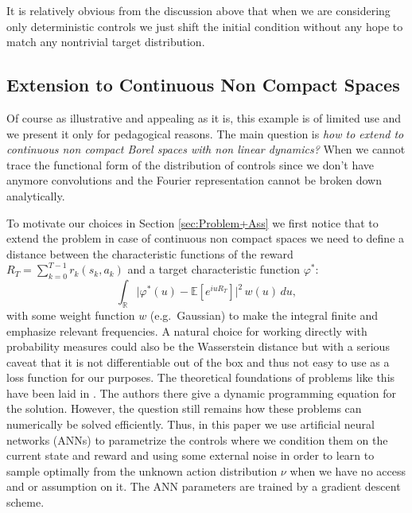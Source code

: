 \documentclass[reqno, 11pt]{amsart}%
\newcommand\EE{\mathbb E}
\theoremstyle{definition}
\newtheorem{remark}[theorem]{Remark}
\begin{document}
	It is relatively obvious from the discussion above that when we are considering only deterministic controls we just shift the initial condition without any hope to match any nontrivial target distribution.  

\subsection{Extension to Continuous Non Compact Spaces} 
Of course as illustrative and appealing as it is, this example is of limited use and we present it only for pedagogical reasons. The main question is \emph{how to extend to continuous non compact Borel spaces with non linear dynamics?} When we cannot trace the functional form of the distribution of controls since we don't have anymore convolutions and the Fourier representation cannot be broken down analytically.  

To motivate our choices in Section \ref{sec:Problem+Ass} we first notice that to extend the problem in case of continuous non compact spaces we need to define a distance between the characteristic functions of the reward $R_T=\sum_{k=0}^{T-1} r_k(s_k,a_k)$ and a target characteristic function $\varphi^*$: 
$$ \int_{\mathbb{R}} \big|\varphi^*(u) - \EE[e^{iuR_T}]\big|^2 \, w(u)\, du,$$
with some weight function $w$ (e.g.\ Gaussian) to make the integral finite and emphasize relevant frequencies. A natural choice for working directly with probability measures could also be the Wasserstein distance but with a serious caveat that it is not differentiable out of the box and thus not easy to use as a loss function for our purposes. The theoretical foundations of problems like this have been laid in \cite{bauerle2025distributionalbellmanequation}. The authors there give a dynamic programming equation for the solution. However, the question still remains how these problems can numerically be solved efficiently.
Thus, in this paper we use artificial neural networks (ANNs) to parametrize the controls where we condition them on the current state and reward and using some external noise in order to learn to sample optimally from the unknown action distribution $\nu$ when we have no access and or assumption on it. The ANN parameters are trained by a gradient descent scheme. 
\end{document}
